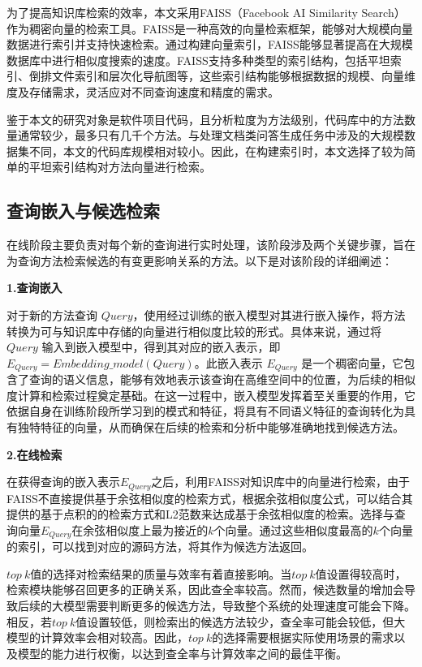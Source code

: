 为了提高知识库检索的效率，本文采用FAISS（Facebook AI Similarity Search）作为稠密向量的检索工具。FAISS是一种高效的向量检索框架，能够对大规模向量数据进行索引并支持快速检索。通过构建向量索引，FAISS能够显著提高在大规模数据库中进行相似度搜索的速度。FAISS支持多种类型的索引结构，包括平坦索引、倒排文件索引和层次化导航图等，这些索引结构能够根据数据的规模、向量维度及存储需求，灵活应对不同查询速度和精度的需求。

鉴于本文的研究对象是软件项目代码，且分析粒度为方法级别，代码库中的方法数量通常较少，最多只有几千个方法。与处理文档类问答生成任务中涉及的大规模数据集不同，本文的代码库规模相对较小。因此，在构建索引时，本文选择了较为简单的平坦索引结构对方法向量进行检索。

\subsection{查询嵌入与候选检索}

在线阶段主要负责对每个新的查询进行实时处理，该阶段涉及两个关键步骤，旨在为查询方法检索候选的有变更影响关系的方法。以下是对该阶段的详细阐述：

\noindent \textbf{1.查询嵌入}

对于新的方法查询 $Query$，使用经过训练的嵌入模型对其进行嵌入操作，将方法转换为可与知识库中存储的向量进行相似度比较的形式。具体来说，通过将 $Query$ 输入到嵌入模型中，得到其对应的嵌入表示，即 $E_{Query}=Embedding\_model(Query)$。此嵌入表示 $E_{Query}$ 是一个稠密向量，它包含了查询的语义信息，能够有效地表示该查询在高维空间中的位置，为后续的相似度计算和检索过程奠定基础。在这一过程中，嵌入模型发挥着至关重要的作用，它依据自身在训练阶段所学习到的模式和特征，将具有不同语义特征的查询转化为具有独特特征的向量，从而确保在后续的检索和分析中能够准确地找到候选方法。

\noindent \textbf{2.在线检索}

在获得查询的嵌入表示$E_{Query}$之后，利用FAISS对知识库中的向量进行检索，由于FAISS不直接提供基于余弦相似度的检索方式，根据余弦相似度公式，可以结合其提供的基于点积的的检索方式和L2范数来达成基于余弦相似度的检索。选择与查询向量$E_{Query}$在余弦相似度上最为接近的$k$个向量。通过这些相似度最高的$k$个向量的索引，可以找到对应的源码方法，将其作为候选方法返回。

$top\ k$值的选择对检索结果的质量与效率有着直接影响。当$top\ k$值设置得较高时，检索模块能够召回更多的正确关系，因此查全率较高。然而，候选数量的增加会导致后续的大模型需要判断更多的候选方法，导致整个系统的处理速度可能会下降。相反，若$top\ k$值设置较低，则检索出的候选方法较少，查全率可能会较低，但大模型的计算效率会相对较高。因此，$top\ k$的选择需要根据实际使用场景的需求以及模型的能力进行权衡，以达到查全率与计算效率之间的最佳平衡。

